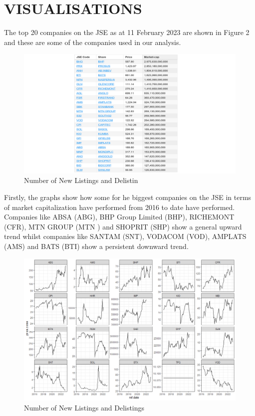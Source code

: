 \documentclass[
]{article}
\begin{document}
\hypertarget{visualisations}{%
\section{VISUALISATIONS}\label{visualisations}}

The top 20 companies on the JSE as at 11 February 2023 are shown in
Figure 2 and these are some of the companies used in our analysis.

\begin{figure}
\centering
\includegraphics{stockprice.png}
\caption{Number of New Listings and Delistin}
\end{figure}

Firstly, the graphs show how some for he biggest companies on the JSE in
terms of market capitalization have performed from 2016 to date have
performed. Companies like ABSA (ABG), BHP Group Limited (BHP), RICHEMONT
(CFR), MTN GROUP (MTN ) and SHOPRIT (SHP) show a general upward trend
whilst companies like SANTAM (SNT), VODACOM (VOD), AMPLATS (AMS) and
BATS (BTI) show a persistent downward trend.

\begin{figure}
\centering
\includegraphics{prices.png}
\caption{Number of New Listings and Delistings}
\end{figure}
\end{document}
